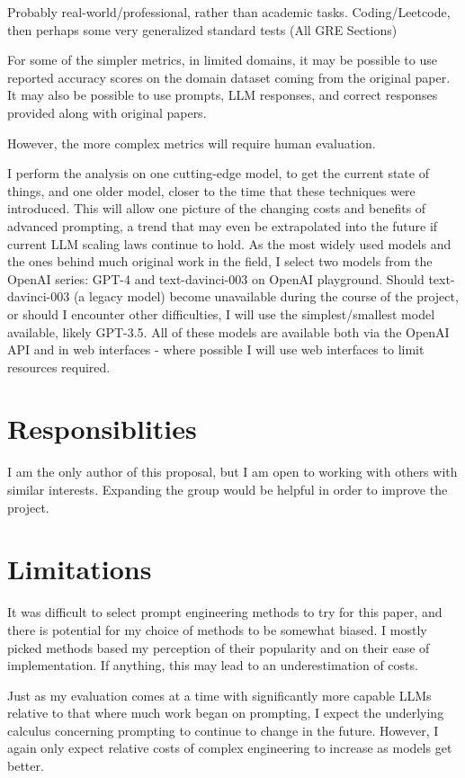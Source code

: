 \documentclass[11pt]{article}
\begin{document}
Probably real-world/professional, rather than academic tasks. Coding/Leetcode, then perhaps some very generalized standard tests (All GRE Sections)

For some of the simpler metrics, in limited domains, it may be possible to use reported accuracy scores on the domain dataset coming from the original paper. It may also be possible to use prompts, LLM responses, and correct responses provided along with original papers. 

However, the more complex metrics will require human evaluation.

I perform the analysis on one cutting-edge model, to get the current state of things, and one older model, closer to the time that these techniques were introduced. This will allow one picture of the changing costs and benefits of advanced prompting, a trend that may even be extrapolated into the future if current LLM scaling laws continue to hold. As the most widely used models and the ones behind much original work in the field, I select two models from the OpenAI series: GPT-4 and text-davinci-003 on OpenAI playground. Should text-davinci-003 (a legacy model) become unavailable during the course of the project, or should I encounter other difficulties, I will use the simplest/smallest model available, likely GPT-3.5. All of these models are available both via the OpenAI API and in web interfaces - where possible I will use web interfaces to limit resources required.

\section{Responsiblities}

I am the only author of this proposal, but I am open to working with others with similar interests. Expanding the group would be helpful in order to improve the project.

\section*{Limitations}

It was difficult to select prompt engineering methods to try for this paper, and there is potential for my choice of methods to be somewhat biased. I mostly picked methods based my perception of their popularity and on their ease of implementation. If anything, this may lead to an underestimation of costs.

Just as my evaluation comes at a time with significantly more capable LLMs relative to that where much work began on prompting, I expect the underlying calculus concerning prompting to continue to change in the future. However, I again only expect relative costs of complex engineering to increase as models get better.
\end{document}
